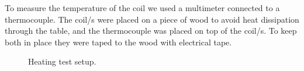 To measure the temperature of the coil we used a multimeter connected to a thermocouple.
The coil/s were placed on a piece of wood to avoid heat dissipation through the table, and the thermocouple was placed on top of the coil/s.
To keep both in place they were taped to the wood with electrical tape.
\begin{figure}
    \centering
    \caption{Heating test setup.}
    \label{fig: Heating_test_setup}
\end{figure}

